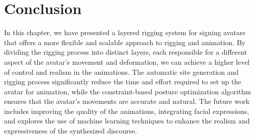 \documentclass[../../main.tex]{subfiles}
\begin{document}
\section{Conclusion}
\label{ch:rigging_layers:conclusion}

In this chapter, we have presented a layered rigging system for signing avatars that offers a more flexible and scalable approach to rigging and animation. By dividing the rigging process into distinct layers, each responsible for a different aspect of the avatar's movement and deformation, we can achieve a higher level of control and realism in the animations. The automatic site generation and rigging process significantly reduce the time and effort required to set up the avatar for animation, while the constraint-based posture optimization algorithm ensures that the avatar's movements are accurate and natural. The future work includes improving the quality of the animations, integrating facial expressions, and explores the use of machine learning techniques to enhance the realism and expressiveness of the synthesized discourse.
\end{document}
